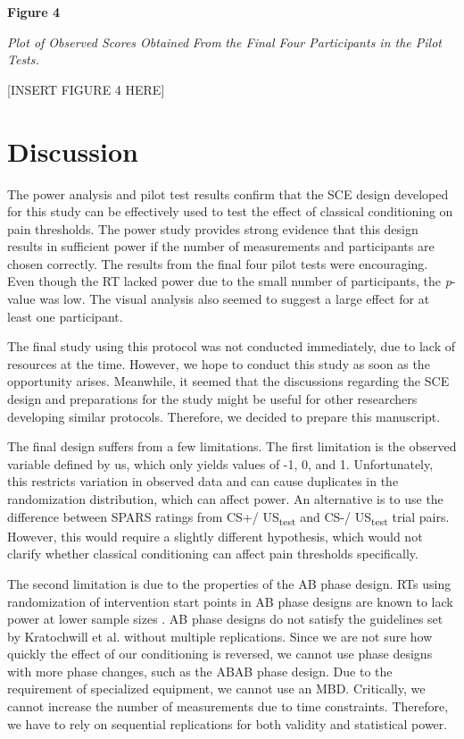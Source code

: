 \documentclass{article}
\begin{document}
\textbf{Figure 4}

\emph{Plot of Observed Scores Obtained }\emph{From}\emph{ the Final Four Participants in the Pilot Tests.}

[INSERT FIGURE 4 HERE]

\section{Discussion}

The power analysis and pilot test results confirm that the SCE design developed for this study can be effectively used to test the effect of classical conditioning on pain thresholds. The power study provides strong evidence that this design results in sufficient power if the number of measurements and participants are chosen correctly. The results from the final four pilot tests were encouraging. Even though the RT lacked power due to the small number of participants, the \emph{p}-value was low. The visual analysis also seemed to suggest a large effect for at least one participant. 

The final study using this protocol was not conducted immediately, due to lack of resources at the time. However, we hope to conduct this study as soon as the opportunity arises. Meanwhile, it seemed that the discussions regarding the SCE design and preparations for the study might be useful for other researchers developing similar protocols. Therefore, we decided to prepare this manuscript.

The final design suffers from a few limitations. The first limitation is the observed variable defined by us, which only yields values of -1, 0, and 1. Unfortunately, this restricts variation in observed data and can cause duplicates in the randomization distribution, which can affect power. An alternative is to use the difference between SPARS ratings from CS+/ US\textsubscript{test} and CS-/ US\textsubscript{test} trial pairs. However, this would require a slightly different hypothesis, which would not clarify whether classical conditioning can affect pain thresholds specifically.

The second limitation is due to the properties of the AB phase design. RTs using randomization of intervention start points in AB phase designs are known to lack power at lower sample sizes \textcite{Michiels2019}. AB phase designs do not satisfy the guidelines set by Kratochwill et al. \textcite{Kratochwill2010a} without multiple replications. Since we are not sure how quickly the effect of our conditioning is reversed, we cannot use phase designs with more phase changes, such as the ABAB phase design. Due to the requirement of specialized equipment, we cannot use an MBD. Critically, we cannot increase the number of measurements due to time constraints. Therefore, we have to rely on sequential replications for both validity and statistical power. 
\end{document}
